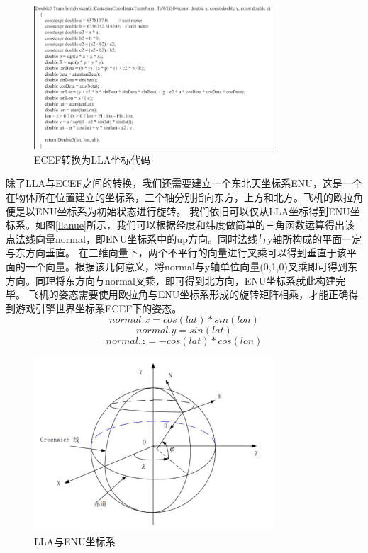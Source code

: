 \begin{figure}[h!]
    \begin{center}
        \includegraphics[width=0.8\textwidth]{pictures/code28.pdf}
        \caption{ECEF转换为LLA坐标代码}
        \label{ecef2lla}
    \end{center}
\end{figure}
\par 
除了LLA与ECEF之间的转换，我们还需要建立一个东北天坐标系ENU，这是一个在物体所在位置建立的坐标系，三个轴分别指向东方，上方和北方。飞机的欧拉角便是以ENU坐标系为初始状态进行旋转。
我们依旧可以仅从LLA坐标得到ENU坐标系。如图\ref{llanue}所示，我们可以根据经度和纬度做简单的三角函数运算得出该点法线向量normal，即ENU坐标系中的up方向。同时法线与y轴所构成的平面一定与东方向垂直。
在三维向量下，两个不平行的向量进行叉乘可以得到垂直于该平面的一个向量。根据该几何意义，将normal与y轴单位向量(0,1,0)叉乘即可得到东方向。同理将东方向与normal叉乘，即可得到北方向，ENU坐标系就此构建完毕。
飞机的姿态需要使用欧拉角与ENU坐标系形成的旋转矩阵相乘，才能正确得到游戏引擎世界坐标系ECEF下的姿态。
$$normal.x=cos(lat) * sin(lon)$$
$$normal.y = sin(lat)$$
$$normal.z = -cos(lat) * cos(lon)$$
\begin{figure}[h!]
    \begin{center}
        \includegraphics[width=0.8\textwidth]{pictures/ecef.png}
        \caption{LLA与ENU坐标系}
        \label{llaneu}
    \end{center}
\end{figure}



